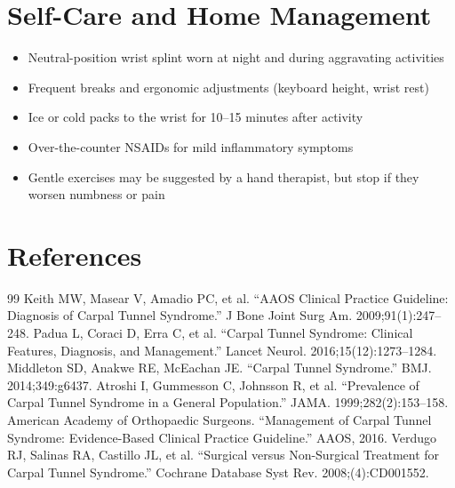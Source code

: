\section*{Self-Care and Home Management}
\begin{itemize}
 \item Neutral-position wrist splint worn at night and during aggravating activities
 \item Frequent breaks and ergonomic adjustments (keyboard height, wrist rest)
 \item Ice or cold packs to the wrist for 10--15 minutes after activity
 \item Over-the-counter NSAIDs for mild inflammatory symptoms
 \item Gentle exercises may be suggested by a hand therapist, but stop if they worsen numbness or pain
\end{itemize}

\section*{References}
\begin{thebibliography}{99}
 Keith MW, Masear V, Amadio PC, et al. ``AAOS Clinical Practice Guideline: Diagnosis of Carpal Tunnel Syndrome.'' J Bone Joint Surg Am. 2009;91(1):247--248.
 Padua L, Coraci D, Erra C, et al. ``Carpal Tunnel Syndrome: Clinical Features, Diagnosis, and Management.'' Lancet Neurol. 2016;15(12):1273--1284.
 Middleton SD, Anakwe RE, McEachan JE. ``Carpal Tunnel Syndrome.'' BMJ. 2014;349:g6437.
 Atroshi I, Gummesson C, Johnsson R, et al. ``Prevalence of Carpal Tunnel Syndrome in a General Population.'' JAMA. 1999;282(2):153--158.
 American Academy of Orthopaedic Surgeons. ``Management of Carpal Tunnel Syndrome: Evidence-Based Clinical Practice Guideline.'' AAOS, 2016.
 Verdugo RJ, Salinas RA, Castillo JL, et al. ``Surgical versus Non-Surgical Treatment for Carpal Tunnel Syndrome.'' Cochrane Database Syst Rev. 2008;(4):CD001552.
\end{thebibliography}
